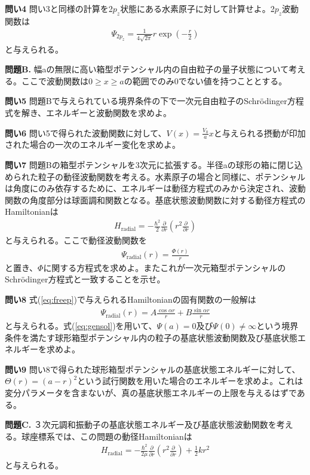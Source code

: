 \documentclass[11pt,pra,aps]{revtex4}
\begin{document}
\noindent
{\bf 問い4} 問い3と同様の計算を2$p_z$状態にある水素原子に対して計算せよ。2$p_z$波動関数は
\begin{align}
  \Psi_{2p_z}=\frac{1}{4\sqrt{2\pi}} r \exp(-\frac{r}{2})
\end{align}
と与えられる。

\noindent
{\bf 問題B.} 幅aの無限に高い箱型ポテンシャル内の自由粒子の量子状態について考える。ここで波動関数は$0\geq x\geq a$の範囲でのみ0でない値を持つこととする。

\noindent
{\bf 問い5} 問題Bで与えられている境界条件の下で一次元自由粒子のSchr\"odinger方程式を解き、エネルギーと波動関数を求めよ。

\noindent
{\bf 問い6} 問い5で得られた波動関数に対して、$V(x)=\frac{V_0}{a}x$と与えられる摂動が印加された場合の一次のエネルギー変化を求めよ。

\noindent
{\bf 問い7} 問題Bの箱型ポテンシャルを3次元に拡張する。半径aの球形の箱に閉じ込められた粒子の動径波動関数を考える。水素原子の場合と同様に、ポテンシャルは角度にのみ依存するために、エネルギーは動径方程式のみから決定され、波動関数の角度部分は球面調和関数となる。基底状態波動関数に対する動径方程式のHamiltonianは
\begin{align}
  H_\text{radial}=-\frac{\hbar^2}{2}\frac{\partial}{\partial r}\left(r^2 \frac{\partial}{\partial r}\right) \label{eq:freep}
\end{align}    
と与えられる。ここで動径波動関数を
\begin{align}
  \Psi_\text{radial}(r)=\frac{\Phi(r)}{r}
\end{align}
と置き、$\Phi$に関する方程式を求めよ。またこれが一次元箱型ポテンシャルのSchr\"odinger方程式と一致することを示せ。

\noindent
{\bf 問い8} 式(\ref{eq:freep})で与えられるHamiltonianの固有関数の一般解は
\begin{align}
  \Psi_\text{radial}(r)=A\frac{\cos\alpha r}{r} + B\frac{\sin\alpha r}{r} \label{eq:gensol}
\end{align}
と与えられる。式(\ref{eq:gensol})を用いて、$\Psi(a)=0$及び$\Psi(0)\neq\infty$という境界条件を満たす球形箱型ポテンシャル内の粒子の基底状態波動関数及び基底状態エネルギーを求めよ。

\noindent
{\bf 問い9} 問い8で得られた球形箱型ポテンシャルの基底状態エネルギーに対して、$\Theta(r)=(a-r)^2$という試行関数を用いた場合のエネルギーを求めよ。これは変分パラメータを含まないが、真の基底状態エネルギーの上限を与えるはずである。

\noindent
{\bf 問題C.} ３次元調和振動子の基底状態エネルギー及び基底状態波動関数を考える。球座標系では、この問題の動径Hamiltonianは
\begin{align}
  H_\text{radial}=-\frac{\hbar^2}{2\mu}\frac{\partial}{\partial r}\left(r^2 \frac{\partial}{\partial r}\right) + \frac{1}{2}kr^2\label{eq:3dp}
\end{align}    
と与えられる。
\end{document}
